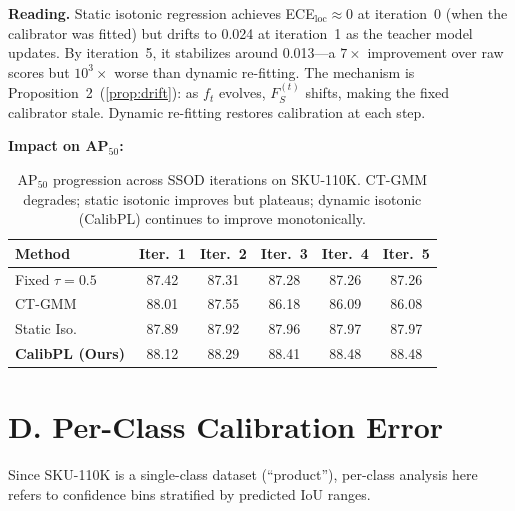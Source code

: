 \documentclass[10pt,twocolumn,letterpaper]{article}
\newcommand{\sku}{\textsc{SKU-110K}}
\begin{document}
\textbf{Reading.} Static isotonic regression achieves
ECE$_\text{loc}\approx0$ at iteration~0 (when the calibrator was fitted) but
drifts to 0.024 at iteration~1 as the teacher model updates. By iteration~5,
it stabilizes around 0.013---a $7\times$ improvement over raw scores but
$10^3\times$ worse than dynamic re-fitting. The mechanism is
Proposition~2~(\ref{prop:drift}): as $f_t$ evolves, $F_S^{(t)}$ shifts, making the
fixed calibrator stale. Dynamic re-fitting restores calibration at each step.

\textbf{Impact on AP$_{50}$:}

\begin{table}[h]
  \centering
  \caption{AP$_{50}$ progression across SSOD iterations on \sku. CT-GMM
  degrades; static isotonic improves but plateaus; dynamic isotonic (CalibPL)
  continues to improve monotonically.}
  \begin{tabular}{lccccc}
    \toprule
    Method & Iter.~1 & Iter.~2 & Iter.~3 & Iter.~4 & Iter.~5 \\
    \midrule
    Fixed $\tau{=}0.5$   & 87.42 & 87.31 & 87.28 & 87.26 & 87.26 \\
    CT-GMM               & 88.01 & 87.55 & 86.18 & 86.09 & 86.08 \\
    Static Iso.~\cite{kuzucu2024calibration} & 87.89 & 87.92 & 87.96 & 87.97 & 87.97 \\
    \textbf{CalibPL (Ours)} & 88.12 & 88.29 & 88.41 & 88.48 & 88.48 \\
    \bottomrule
  \end{tabular}
  \label{tab:ap_progression}
\end{table}

\section*{D. Per-Class Calibration Error}
\label{sec:per_class}

Since SKU-110K is a single-class dataset (``product''), per-class analysis
here refers to confidence bins stratified by predicted IoU ranges.
\end{document}
